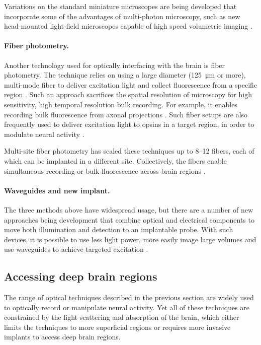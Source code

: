 Variations on the standard miniature microscopes are being 
developed that incorporate some of the advantages of multi-photon
microscopy, such as new head-mounted light-field microscopes 
capable of high speed volumetric imaging \cite{Skocek:2018hs}.

\paragraph{Fiber photometry.} Another technology used 
for optically interfacing with the brain is fiber photometry. 
The technique relies on using a large diameter 
(125~\si{\micro\meter} or more), multi-mode fiber to 
deliver excitation light and collect fluorescence from a 
specific region 
\cite{Adelsberger:2005dy,Cui:2013dq,Adelsberger:2014jd}.
Such an approach sacrifices the spatial resolution of 
microscopy for high sensitivity, high temporal resolution 
bulk recording. For example, it enables recording bulk 
fluorescence from axonal projections \cite{Gunaydin:2014dh}. 
Such fiber setups are also frequently used to deliver 
excitation light to opsins in a target region, in order
to modulate neural activity \cite{Warden:2014bx}.

Multi-site fiber photometry has scaled these techniques up to 
8--12 fibers, each of which can be implanted in a different site.
Collectively, the fibers enable simultaneous recording or bulk 
fluorescence across brain regions \cite{Guo:2015gu}.

\paragraph{Waveguides and new implant.} The three methods 
above have widespread usage, but there are a number of new 
approaches being development that combine optical and electrical 
components to move both illumination and detection to an implantable probe.
With such devices, it is possible to use less light power, 
more easily image large volumes and use waveguides to achieve 
targeted excitation \cite{Warden:2014bx,Wu:2015gk,Segev:2017en}.

\subsection{Accessing deep brain regions}

The range of optical techniques described in the previous 
section are widely used to optically record or manipulate 
neural activity. Yet all of these techniques are constrained 
by the light scattering and absorption of the brain, which 
either limits the techniques to more superficial regions or 
requires more invasive implants to access deep brain regions.


